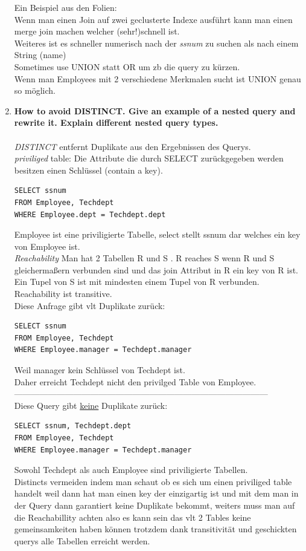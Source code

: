 \documentclass[12pt]{article}\pagestyle{myheadings}
\theoremstyle{plain}
\begin{document}
\begin{enumerate}
Ein Beispiel aus den Folien:\\
Wenn man einen Join auf zwei geclusterte Indexe ausführt kann man einen merge join machen welcher (sehr!)schnell ist.\\
Weiteres ist es schneller numerisch nach der \textit{ssnum} zu suchen als nach einem String (name)\\
Sometimes use UNION statt OR um zb die query zu kürzen.\\
Wenn man Employees mit 2 verschiedene Merkmalen sucht ist UNION genau so möglich.


\item \textbf{How to avoid DISTINCT. Give an example of a nested query and rewrite it. Explain different nested query
types.
} \\ \\
\textit{DISTINCT} entfernt Duplikate aus den Ergebnissen des Querys.\\
\textit{priviliged} table: Die Attribute die durch SELECT zurückgegeben werden besitzen einen Schlüssel (contain a key).
\begin{verbatim}
SELECT ssnum
FROM Employee, Techdept
WHERE Employee.dept = Techdept.dept
\end{verbatim}
Employee ist eine priviligierte Tabelle, select stellt ssnum dar welches ein key von Employee ist.\\
\textit{Reachability} Man hat 2 Tabellen R und S .
R reaches S wenn R und S gleichermaßern verbunden sind und das join Attribut in R ein key von R ist.\\
Ein Tupel von S ist mit mindesten einem Tupel von R verbunden.\\
Reachability ist transitive.\\
Diese Anfrage gibt vlt Duplikate zurück:
\begin{verbatim}
SELECT ssnum
FROM Employee, Techdept
WHERE Employee.manager = Techdept.manager
\end{verbatim}
Weil manager kein Schlüssel von Techdept ist.\\
Daher erreicht Techdept nicht den privilged Table von Employee.\\------------------------------------------------------------------------------------------ \\
Diese Query gibt \underline{keine} Duplikate zurück:
\begin{verbatim}
SELECT ssnum, Techdept.dept
FROM Employee, Techdept
WHERE Employee.manager = Techdept.manager
\end{verbatim}
Sowohl Techdept als auch Employee sind priviligierte Tabellen.\\ Distincts vermeiden indem man schaut ob es sich um einen priviliged table handelt weil dann hat man einen key der einzigartig ist und mit dem man in der Query dann garantiert keine Duplikate bekommt, weiters muss man auf die Reachabillity achten also es kann sein das vlt 2 Tables keine gemeinsamkeiten haben können trotzdem dank transitivität und geschickten querys alle Tabellen erreicht werden.\\ \\

\end{enumerate}
\end{document}
